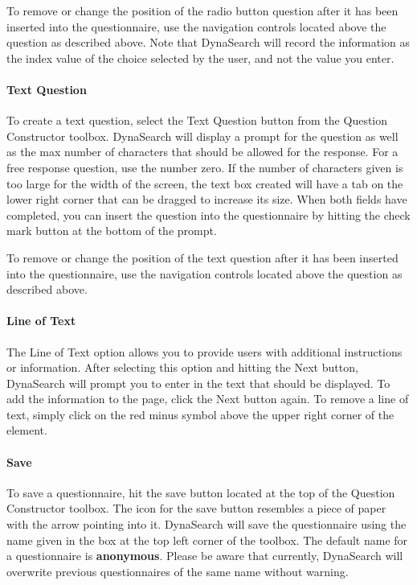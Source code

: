 \documentclass[article]{ij4uq}              %
\begin{document}
To remove or change the position of the radio button question after it has been inserted into the questionnaire, use the navigation controls located above the question as described above.  Note that DynaSearch will record the information as the index value of the choice selected by the user, and not the value you enter. 

\paragraph{Text Question}
To create a text question, select the Text Question button from the Question Constructor toolbox.  DynaSearch will display a prompt for the question as well as the max number of characters that should be allowed for the response.   For a free response question, use the number zero.  If the number of characters given is too large for the width of the screen, the text box created will have a tab on the lower right corner that can be dragged to increase its size.  When both fields have completed, you can insert the question into the questionnaire by hitting the check mark button at the bottom of the prompt.

To remove or change the position of the text question after it has been inserted into the questionnaire, use the navigation controls located above the question as described above. 

\paragraph{Line of Text}
The Line of Text option allows you to provide users with additional instructions or information. After selecting this option and hitting the Next button, DynaSearch will prompt you to enter in the text that should be displayed. To add the information to the page, click the Next button again. To remove a line of text, simply click on the red minus symbol above the upper right corner of the element.

\paragraph{Save}
To save a questionnaire, hit the save button located at the top of the Question Constructor toolbox.  The icon for the save button resembles a piece of paper with the arrow pointing into it.  DynaSearch will save the questionnaire using the name given in the box at the top left corner of the toolbox.  The default name for a questionnaire is \textbf{anonymous}.  Please be aware that currently, DynaSearch will overwrite previous questionnaires of the same name without warning.
\end{document}
